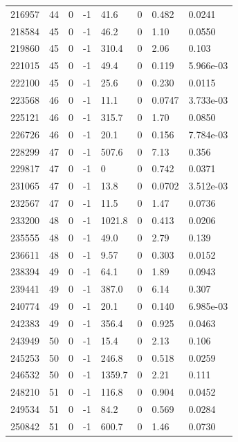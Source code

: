 \documentclass[preview]{standalone}
\begin{document}
{{{{{\begin{tabular}{L{1.2cm}C{1.2cm} C{0.3cm}C{0.5cm} C{1.4cm}C{1.4cm} C{1.4cm}C{1.4cm}}
  216957  &    44  & 0     & -1 &  41.6  & 0  & 0.482 &  0.0241   \\ 
  218584  &    45  & 0     & -1 &  46.2  & 0  & 1.10 &  0.0550   \\ 
  219860  &    45  & 0     & -1 &  310.4  & 0  & 2.06 &  0.103   \\ 
  221015  &    45  & 0     & -1 &  49.4  & 0  & 0.119 &  5.966e-03   \\ 
  222100  &    45  & 0     & -1 &  25.6  & 0  & 0.230 &  0.0115   \\ 
  223568  &    46  & 0     & -1 &  11.1  & 0  & 0.0747 &  3.733e-03   \\ 
  225121  &    46  & 0     & -1 &  315.7  & 0  & 1.70 &  0.0850   \\ 
  226726  &    46  & 0     & -1 &  20.1  & 0  & 0.156 &  7.784e-03   \\ 
  228299  &    47  & 0     & -1 &  507.6  & 0  & 7.13 &  0.356   \\ 
  229817  &    47  & 0     & -1 &  0  & 0  & 0.742 &  0.0371   \\ 
  231065  &    47  & 0     & -1 &  13.8  & 0  & 0.0702 &  3.512e-03   \\ 
  232567  &    47  & 0     & -1 &  11.5  & 0  & 1.47 &  0.0736   \\ 
  233200  &    48  & 0     & -1 &  1021.8  & 0  & 0.413 &  0.0206   \\ 
  235555  &    48  & 0     & -1 &  49.0  & 0  & 2.79 &  0.139   \\ 
  236611  &    48  & 0     & -1 &  9.57  & 0  & 0.303 &  0.0152   \\ 
  238394  &    49  & 0     & -1 &  64.1  & 0  & 1.89 &  0.0943   \\ 
  239441  &    49  & 0     & -1 &  387.0  & 0  & 6.14 &  0.307   \\ 
  240774  &    49  & 0     & -1 &  20.1  & 0  & 0.140 &  6.985e-03   \\ 
  242383  &    49  & 0     & -1 &  356.4  & 0  & 0.925 &  0.0463   \\ 
  243949  &    50  & 0     & -1 &  15.4  & 0  & 2.13 &  0.106   \\ 
  245253  &    50  & 0     & -1 &  246.8  & 0  & 0.518 &  0.0259   \\ 
  246532  &    50  & 0     & -1 &  1359.7  & 0  & 2.21 &  0.111   \\ 
  248210  &    51  & 0     & -1 &  116.8  & 0  & 0.904 &  0.0452   \\ 
  249534  &    51  & 0     & -1 &  84.2  & 0  & 0.569 &  0.0284   \\ 
  250842  &    51  & 0     & -1 &  600.7  & 0  & 1.46 &  0.0730   \\ 
\hline 
\end{tabular} 

}}}}}
\end{document}
